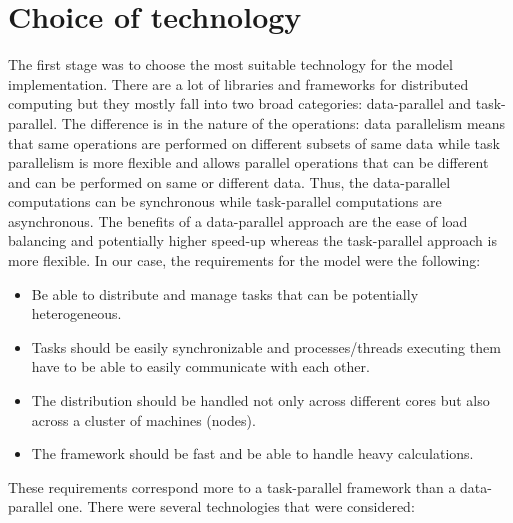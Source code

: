 \documentclass[titlepage]{article}
\begin{document}
\section{Choice of technology}
The first stage was to choose the most suitable technology for the model implementation. There are a lot of libraries and frameworks for distributed computing but they mostly fall into two broad categories: data-parallel and task-parallel. The difference is in the nature of the operations: data parallelism means that same operations are performed on different subsets of same data while task parallelism is more flexible and allows parallel operations that can be different and can be performed on same or different data. Thus, the data-parallel computations can be synchronous while task-parallel computations are asynchronous. The benefits of a data-parallel approach are the ease of load balancing and potentially higher speed-up whereas the task-parallel approach is more flexible. In our case, the requirements for the model were the following:
\begin{itemize}
\item Be able to distribute and manage tasks that can be potentially heterogeneous. 
\item Tasks should be easily synchronizable and processes/threads executing them have to be able to easily communicate with each other. 
\item The distribution should be handled not only across different cores but also across a cluster of machines (nodes).
\item The framework should be fast and be able to handle heavy calculations.
\end{itemize}
These requirements correspond more to a task-parallel framework than a data-parallel one. There were several technologies that were considered:
\end{document}
